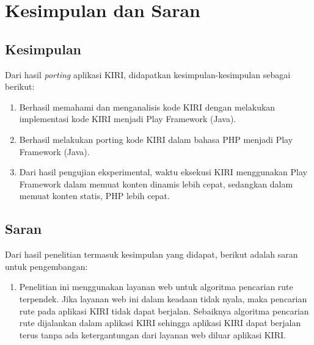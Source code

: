 \chapter{Kesimpulan dan Saran}
\label{chap:kesimpulan_saran}

\section{Kesimpulan}
\label{sec:kesimpulan}

Dari hasil \textit{porting} aplikasi KIRI, didapatkan kesimpulan-kesimpulan sebagai berikut:
	\begin{enumerate}
		\item Berhasil memahami dan menganalisis kode KIRI dengan melakukan implementasi kode KIRI menjadi Play Framework (Java).
		\item Berhasil melakukan porting kode KIRI dalam bahasa PHP menjadi Play Framework (Java). 
		\item Dari hasil pengujian eksperimental, waktu eksekusi KIRI menggunakan Play Framework dalam memuat konten dinamis lebih cepat, sedangkan dalam memuat konten statis, PHP lebih cepat.
	\end{enumerate}

\section{Saran}
\label{sec:saran}
Dari hasil penelitian termasuk kesimpulan yang didapat, berikut adalah saran untuk pengembangan:
\begin{enumerate}
	\item Penelitian ini menggunakan layanan web untuk algoritma pencarian rute terpendek. Jika layanan web ini dalam keadaan tidak nyala, maka pencarian rute pada aplikasi KIRI tidak dapat berjalan. Sebaiknya algoritma pencarian rute dijalankan dalam aplikasi KIRI sehingga aplikasi KIRI dapat berjalan terus tanpa ada ketergantungan dari layanan web diluar aplikasi KIRI.
\end{enumerate}